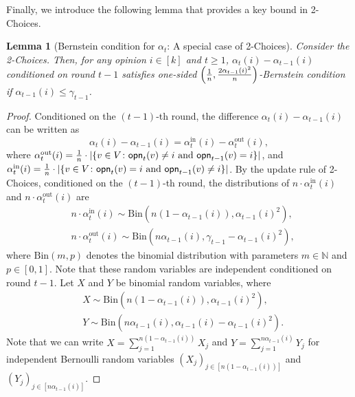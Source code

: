 \documentclass[letterpaper,11pt]{article}
\newtheorem{lemma}[theorem]{Lemma}
\DeclarePairedDelimiter{\cbra}{\lbrace}{\rbrace} %
\newcommand{\Nat}{\mathbb{N}}
\newcommand{\alphanorm}{\gamma}
\newcommand{\opinion}{\mathsf{opn}}
\newcommand{\alphain}{\alpha^{\mathrm{in}}}
\newcommand{\alphaout}{\alpha^{\mathrm{out}}}
\newcommand{\Bin}{\mathrm{Bin}}
\begin{document}
  Finally, we introduce the following lemma that provides a key bound in 2-Choices.
\begin{lemma}[Bernstein condition for $\alpha_t$: A special case of 2-Choices]
\label{lem:concentration of alpha difference for 2 choices}
    Consider the 2-Choices.
    Then, for any opinion $i\in [k]$ and $t\ge 1$, 
    $\alpha_t(i) - \alpha_{t-1}(i)$ conditioned on round $t-1$ satisfies one-sided $\qty(\frac{1}{n},\frac{2\alpha_{t-1}(i)^2}{n})$-Bernstein condition if 
    $\alpha_{t-1}(i)\leq \alphanorm_{t-1}$.
  \end{lemma}
  \begin{proof}
    Conditioned on the $(t-1)$-th round, the difference $\alpha_t(i) - \alpha_{t-1}(i)$ can be written as
    \[
      \alpha_t(i) - \alpha_{t-1}(i) = \alphain_t(i) - \alphaout_t(i),
    \]
    where $\alphaout_t(i) = \frac{1}{n}\cdot |\cbra{v \in V \colon \opinion_t(v) \neq i \text{ and } \opinion_{t-1}(v) = i}|$, and
     $\alphain_t(i) = \frac{1}{n}\cdot |\cbra{v \in V \colon \opinion_t(v) = i \text{ and }\opinion_{t-1}(v)\ne i}|$.
    By the update rule of 2-Choices, conditioned on the $(t-1)$-th round, the distributions of $n\cdot \alphain_t(i)$ and $n\cdot \alphaout_t(i)$ are
    \begin{align*}
      &n\cdot \alphain_t(i) \sim \Bin(n(1-\alpha_{t-1}(i)),\alpha_{t-1}(i)^2),\\
      &n\cdot \alphaout_t(i) \sim \Bin(n\alpha_{t-1}(i), \alphanorm_{t-1} - \alpha_{t-1}(i)^2),
    \end{align*}
    where $\Bin(m,p)$ denotes the binomial distribution with parameters $m\in\Nat$ and $p\in[0,1]$.
    Note that these random variables are independent conditioned on round $t-1$.
    Let $X$ and $Y$ be binomial random variables, where 
    \begin{align*}
        &X\sim\Bin(n(1-\alpha_{t-1}(i)), \alpha_{t-1}(i)^2),\\
        &Y\sim\Bin(n\alpha_{t-1}(i),\alpha_{t-1}(i)-\alpha_{t-1}(i)^2).
    \end{align*}
    Note that we can write 
    $X=\sum_{j=1}^{n(1-\alpha_{t-1}(i))}X_j$ and 
    $Y=\sum_{j=1}^{n\alpha_{t-1}(i)}Y_j$ for independent Bernoulli random variables $(X_j)_{j\in [n(1-\alpha_{t-1}(i))]}$ and $(Y_j)_{j\in [n\alpha_{t-1}(i)]}$.

\end{proof}
\end{document}

